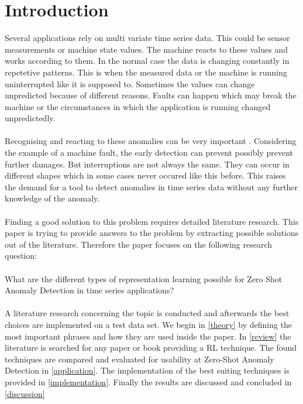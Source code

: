 \section{Introduction}\label{intro}
Several applications rely on multi variate time series data. This could be sensor measurements or machine state values. The machine reacts to these values and works according to them. In the normal case the data is changing constantly in repetetive patterns. This is when the measured data or the machine is running uninterrupted like it is supposed to. Sometimes the values can change unpredicted because of different reasons. Faults can happen which may break the machine or the circumstances in which the application is running changed unpredictedly.\\\\
Recognising and reacting to these anomalies can be very important %
. Considering the example of a machine fault, the early detection can prevent possibly prevent further damages. But interruptions are not always the same. They can occur in different shapes which in some cases never occured like this before. This raises the demand for a tool to detect anomalies in time series data without any further knowledge of the anomaly.\\\\
Finding a good solution to this problem requires detailed literature research. This paper is trying to provide answers to the problem by extracting possible solutions out of the literature. Therefore the paper focuses on the following research question:\\\\
What are the different types of representation learning possible for Zero Shot Anomaly Detection in time series applications?\\\\
A literature research concerning the topic is conducted and afterwards the best choices are implemented on a test data set. We begin in \ref{theory} by defining the most important phrases and how they are used inside the paper. In \ref{review} the literature is searched for any paper or book providing a RL technique. The found techniques are compared and evaluated for usability at Zero-Shot Anomaly Detection in \ref{application}. The implementation of the best suiting techniques is provided in \ref{implementation}. Finally the results are discussed and concluded in \ref{discussion}
